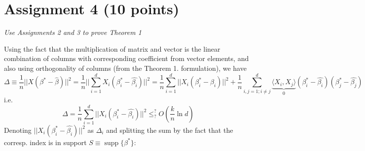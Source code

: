 \documentclass[]{article}
\DeclareMathOperator\supp{supp}
\begin{document}
\section*{Assignment 4 (10 points)}
\textit{Use Assignments 2 and 3 to prove Theorem 1}

Using the fact that the multiplication of matrix and vector is the linear combination of columns with corresponding coefficient from vector elements, and also using orthogonality of columns (from the Theorem 1. formulation), we have
$$\Delta \equiv \frac{1}{n}||X(\beta^*-\hat{\beta})||^2 = 
\frac{1}{n}||\sum_{i=1}^d X_i(\beta_i^*-\hat{\beta_i})||^2 = 
\frac{1}{n}\sum_{i=1}^d || X_i(\beta_i^*-\hat{\beta_i})||^2 + 
\frac{1}{n}\sum_{i, j=1; i\ne j}^d \underbrace{\langle X_i, X_j\rangle}_{0} (\beta_i^*-\hat{\beta_i})(\beta_j^*-\hat{\beta_j})
$$
i.e. 
$$ \Delta = \frac{1}{n}\sum_{i=1}^d || X_i(\beta_i^*-\hat{\beta_i})||^2 \le^{?}_? O(\frac{k}{n}\ln d)
$$
Denoting $|| X_i(\beta_i^*-\hat{\beta_i})||^2$ as $\Delta_i$ and splitting the sum by the fact that the corresp. index is in support $S\equiv \supp\{\beta^*\}$:
\end{document}
